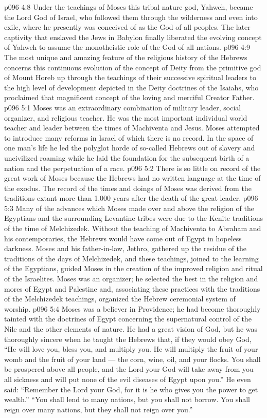\vs p096 4:8 Under the teachings of Moses this tribal nature god, Yahweh, became the Lord God of Israel, who followed them through the wilderness and even into exile, where he presently was conceived of as the God of all peoples. The later captivity that enslaved the Jews in Babylon finally liberated the evolving concept of Yahweh to assume the monotheistic role of the God of all nations.
\vs p096 4:9 The most unique and amazing feature of the religious history of the Hebrews concerns this continuous evolution of the concept of Deity from the primitive god of Mount Horeb up through the teachings of their successive spiritual leaders to the high level of development depicted in the Deity doctrines of the Isaiahs, who proclaimed that magnificent concept of the loving and merciful Creator Father.
\vs p096 5:1 Moses was an extraordinary combination of military leader, social organizer, and religious teacher. He was the most important individual world teacher and leader between the times of Machiventa and Jesus. Moses attempted to introduce many reforms in Israel of which there is no record. In the space of one man’s life he led the polyglot horde of so\hyp{}called Hebrews out of slavery and uncivilized roaming while he laid the foundation for the subsequent birth of a nation and the perpetuation of a race.
\vs p096 5:2 There is so little on record of the great work of Moses because the Hebrews had no written language at the time of the exodus. The record of the times and doings of Moses was derived from the traditions extant more than 1,000 years after the death of the great leader.
\vs p096 5:3 Many of the advances which Moses made over and above the religion of the Egyptians and the surrounding Levantine tribes were due to the Kenite traditions of the time of Melchizedek. Without the teaching of Machiventa to Abraham and his contemporaries, the Hebrews would have come out of Egypt in hopeless darkness. Moses and his father\hyp{}in\hyp{}law, Jethro, gathered up the residue of the traditions of the days of Melchizedek, and these teachings, joined to the learning of the Egyptians, guided Moses in the creation of the improved religion and ritual of the Israelites. Moses was an organizer; he selected the best in the religion and mores of Egypt and Palestine and, associating these practices with the traditions of the Melchizedek teachings, organized the Hebrew ceremonial system of worship.
\vs p096 5:4 \pc Moses was a believer in Providence; he had become thoroughly tainted with the doctrines of Egypt concerning the supernatural control of the Nile and the other elements of nature. He had a great vision of God, but he was thoroughly sincere when he taught the Hebrews that, if they would obey God, “He will love you, bless you, and multiply you. He will multiply the fruit of your womb and the fruit of your land --- the corn, wine, oil, and your flocks. You shall be prospered above all people, and the Lord your God will take away from you all sickness and will put none of the evil diseases of Egypt upon you.” He even said: “Remember the Lord your God, for it is he who gives you the power to get wealth.” “You shall lend to many nations, but you shall not borrow. You shall reign over many nations, but they shall not reign over you.”
